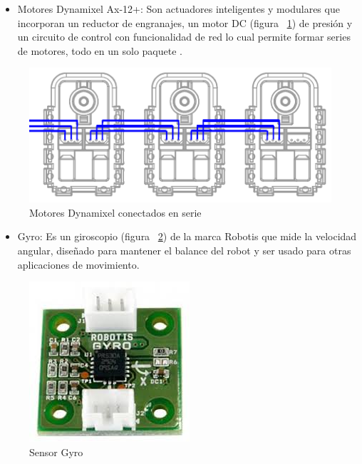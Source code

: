 \begin{itemize}

\item Motores Dynamixel Ax-12+: Son actuadores inteligentes y modulares que incorporan un reductor de engranajes, un motor DC  (figura ~\ref{fig:motoresDc}) de presión y un circuito de control con funcionalidad de red lo cual permite formar series de motores, todo en un solo paquete \cite{manual}. 
\end{itemize}

\begin{figure}[hbtp]
\label{fig:motoresDc}
\centering
\includegraphics[scale=0.5]{imagenes/AX-12_serie.png}
\caption{Motores Dynamixel conectados en serie}
\end{figure}

\begin{itemize}
\item Gyro: Es un giroscopio (figura ~\ref{fig:gyro}) de la marca Robotis que mide la velocidad angular, diseñado para mantener el balance del robot y ser usado para otras aplicaciones de movimiento. \cite{gyro} 

\end{itemize}

\begin{figure}[hbtp]
\centering
\label{fig:gyro}
\includegraphics[scale=0.3]{imagenes/gyro.jpg}
\caption{Sensor Gyro}
\end{figure}

